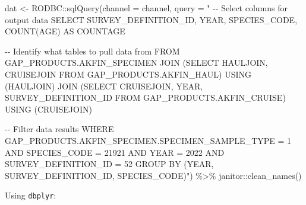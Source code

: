 \documentclass[
  letterpaper,
  oneside,
  open=any]{scrbook}
\newenvironment{Shaded}{\begin{snugshade}}{\end{snugshade}}
\newcommand{\AttributeTok}[1]{\textcolor[rgb]{0.40,0.45,0.13}{#1}}
\newcommand{\FunctionTok}[1]{\textcolor[rgb]{0.28,0.35,0.67}{#1}}
\newcommand{\NormalTok}[1]{\textcolor[rgb]{0.00,0.23,0.31}{#1}}
\newcommand{\OtherTok}[1]{\textcolor[rgb]{0.00,0.23,0.31}{#1}}
\newcommand{\SpecialCharTok}[1]{\textcolor[rgb]{0.37,0.37,0.37}{#1}}
\newcommand{\StringTok}[1]{\textcolor[rgb]{0.13,0.47,0.30}{#1}}
\begin{document}
\begin{Shaded}
\begin{Highlighting}[]
\NormalTok{dat }\OtherTok{\textless{}{-}}\NormalTok{ RODBC}\SpecialCharTok{::}\FunctionTok{sqlQuery}\NormalTok{(}\AttributeTok{channel =}\NormalTok{ channel,}
                       \AttributeTok{query =} \StringTok{"}
\StringTok{{-}{-} Select columns for output data}
\StringTok{SELECT SURVEY\_DEFINITION\_ID, YEAR, SPECIES\_CODE, }
\StringTok{COUNT(AGE) AS COUNTAGE}

\StringTok{{-}{-} Identify what tables to pull data from}
\StringTok{FROM GAP\_PRODUCTS.AKFIN\_SPECIMEN}
\StringTok{JOIN (SELECT HAULJOIN, CRUISEJOIN FROM GAP\_PRODUCTS.AKFIN\_HAUL)}
\StringTok{USING (HAULJOIN)}
\StringTok{JOIN (SELECT CRUISEJOIN, YEAR, SURVEY\_DEFINITION\_ID FROM GAP\_PRODUCTS.AKFIN\_CRUISE)}
\StringTok{USING (CRUISEJOIN)}

\StringTok{{-}{-} Filter data results}
\StringTok{WHERE GAP\_PRODUCTS.AKFIN\_SPECIMEN.SPECIMEN\_SAMPLE\_TYPE = 1}
\StringTok{AND SPECIES\_CODE = 21921}
\StringTok{AND YEAR = 2022}
\StringTok{AND SURVEY\_DEFINITION\_ID = 52}
\StringTok{GROUP BY (YEAR, SURVEY\_DEFINITION\_ID, SPECIES\_CODE)"}\NormalTok{) }\SpecialCharTok{\%\textgreater{}\%} 
\NormalTok{  janitor}\SpecialCharTok{::}\FunctionTok{clean\_names}\NormalTok{()}
\end{Highlighting}
\end{Shaded}

Using \texttt{dbplyr}:
\end{document}
